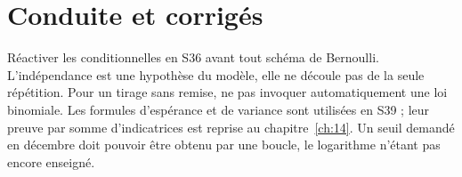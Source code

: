 \ifmxteacher\mxnewpage\section{Conduite et corrigés}\begin{teachernote}Réactiver les conditionnelles en S36 avant tout schéma de Bernoulli. L'indépendance est une hypothèse du modèle, elle ne découle pas de la seule répétition. Pour un tirage sans remise, ne pas invoquer automatiquement une loi binomiale. Les formules d'espérance et de variance sont utilisées en S39 ; leur preuve par somme d'indicatrices est reprise au chapitre~\ref{ch:14}. Un seuil demandé en décembre doit pouvoir être obtenu par une boucle, le logarithme n'étant pas encore enseigné.\end{teachernote}

